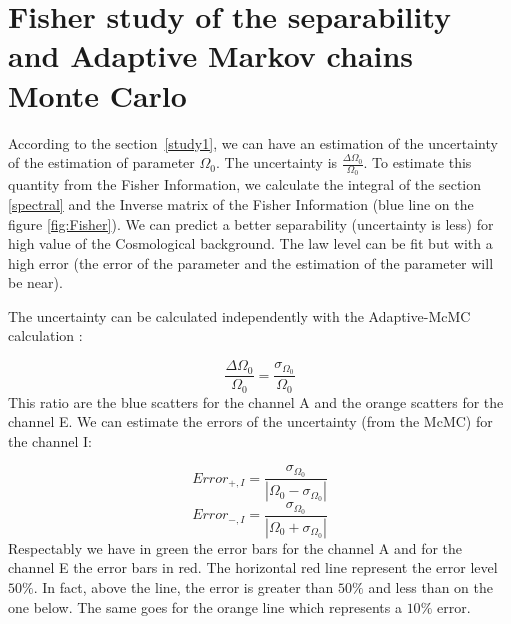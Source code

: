 \documentclass[a4paper,12pt]{article}
\begin{document}
\section{Fisher study of the separability and Adaptive Markov chains Monte Carlo} \label{sc:fisher+MCMC}

According to the section~\ref{study1}, we can have an estimation of the uncertainty of the estimation of parameter $\Omega_0$. The uncertainty is $\frac{\Delta \Omega_0}{\Omega_0}$. To estimate this quantity from the Fisher Information, we calculate the integral of the section \ref{spectral}    and the Inverse matrix of the Fisher Information (blue line on the figure \ref{fig:Fisher}). We can predict a better separability (uncertainty is less) for high value of the Cosmological background. The law level can be fit but with a high error (the error of the parameter and the estimation of the parameter will be near). 

The uncertainty can be calculated independently with the Adaptive-McMC calculation : 

\begin{equation}
\frac{\Delta \Omega_0}{\Omega_0} = \frac{\sigma_{\Omega_0}}{\Omega_0}
\end{equation}This ratio are the blue scatters for the channel A and the orange scatters for the channel E. We can estimate the errors of the uncertainty (from the McMC) for the channel I:

\begin{equation}
{Error}_{+,I} = \frac{\sigma_{\Omega_0}}{\left|\Omega_0-\sigma_{\Omega_0}\right|}
\end{equation}
\begin{equation}
{Error}_{-,I} = \frac{\sigma_{\Omega_0}}{\left|\Omega_0+\sigma_{\Omega_0}\right|}
\end{equation}Respectably we have in green the error bars for the channel A and for the channel E the error bars in red. The horizontal red line represent the error level $50\%$. In fact, above the line, the error is greater than $50\%$ and less than on the one below. The same goes for the orange line which represents a $10\%$ error.
\end{document}
